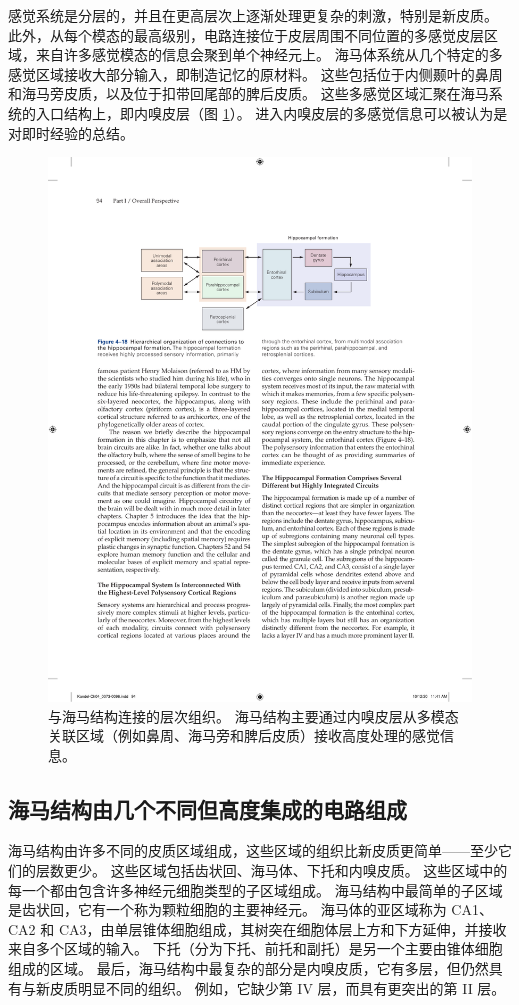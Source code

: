 感觉系统是分层的，并且在更高层次上逐渐处理更复杂的刺激，特别是新皮质。 
此外，从每个模态的最高级别，电路连接位于皮层周围不同位置的多感觉皮层区域，来自许多感觉模态的信息会聚到单个神经元上。 
海马体系统从几个特定的多感觉区域接收大部分输入，即制造记忆的原材料。 
这些包括位于内侧颞叶的鼻周和海马旁皮质，以及位于扣带回尾部的脾后皮质。 
这些多感觉区域汇聚在海马系统的入口结构上，即内嗅皮层（图 \ref{fig:4_18}）。 
进入内嗅皮层的多感觉信息可以被认为是对即时经验的总结。

\begin{figure}[htbp]
	\centering
	\includegraphics[width=1.0\linewidth]{chap04/fig_4_18}
	\caption{与海马结构连接的层次组织。 
		海马结构主要通过内嗅皮层从多模态关联区域（例如鼻周、海马旁和脾后皮质）接收高度处理的感觉信息。}
	\label{fig:4_18}
\end{figure}

\subsection{海马结构由几个不同但高度集成的电路组成}
海马结构由许多不同的皮质区域组成，这些区域的组织比新皮质更简单——至少它们的层数更少。 
这些区域包括齿状回、海马体、下托和内嗅皮质。 
这些区域中的每一个都由包含许多神经元细胞类型的子区域组成。 
海马结构中最简单的子区域是齿状回，它有一个称为颗粒细胞的主要神经元。 
海马体的亚区域称为 CA1、CA2 和 CA3，由单层锥体细胞组成，其树突在细胞体层上方和下方延伸，并接收来自多个区域的输入。 
下托（分为下托、前托和副托）是另一个主要由锥体细胞组成的区域。 
最后，海马结构中最复杂的部分是内嗅皮质，它有多层，但仍然具有与新皮质明显不同的组织。 
例如，它缺少第 IV 层，而具有更突出的第 II 层。


